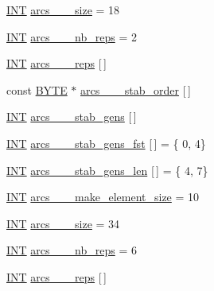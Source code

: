 \begin{DoxyCompactItemize}
\item 
\mbox{\hyperlink{galois_8h_a09fddde158a3a20bd2dcadb609de11dc}{I\+NT}} \mbox{\hyperlink{data__hyperovals_8_c_ae3995856eaa98577c99a31e5ce34eaf9}{arcs\+\_\+\_\+\_\+size}} = 18
\item 
\mbox{\hyperlink{galois_8h_a09fddde158a3a20bd2dcadb609de11dc}{I\+NT}} \mbox{\hyperlink{data__hyperovals_8_c_a71de31b2b031359e9dc748f8ffa0613e}{arcs\+\_\+\_\+\_\+nb\+\_\+reps}} = 2
\item 
\mbox{\hyperlink{galois_8h_a09fddde158a3a20bd2dcadb609de11dc}{I\+NT}} \mbox{\hyperlink{data__hyperovals_8_c_a582766518ac36ef31274b15f9a3f41bd}{arcs\+\_\+\_\+\_\+reps}} \mbox{[}$\,$\mbox{]}
\item 
const \mbox{\hyperlink{galois_8h_ab6cc7b4aeb6ea31aba2b3fbfc83ff5e6}{B\+Y\+TE}} $\ast$ \mbox{\hyperlink{data__hyperovals_8_c_a9ccc6fe66ced70ae50d20d56d840eaa4}{arcs\+\_\+\_\+\_\+stab\+\_\+order}} \mbox{[}$\,$\mbox{]}
\item 
\mbox{\hyperlink{galois_8h_a09fddde158a3a20bd2dcadb609de11dc}{I\+NT}} \mbox{\hyperlink{data__hyperovals_8_c_aa7153565dd8f8939c4ba08174e981ea4}{arcs\+\_\+\_\+\_\+stab\+\_\+gens}} \mbox{[}$\,$\mbox{]}
\item 
\mbox{\hyperlink{galois_8h_a09fddde158a3a20bd2dcadb609de11dc}{I\+NT}} \mbox{\hyperlink{data__hyperovals_8_c_a3324a863b82983f162ecf7af92f4b6a7}{arcs\+\_\+\_\+\_\+stab\+\_\+gens\+\_\+fst}} \mbox{[}$\,$\mbox{]} = \{ 0, 4\}
\item 
\mbox{\hyperlink{galois_8h_a09fddde158a3a20bd2dcadb609de11dc}{I\+NT}} \mbox{\hyperlink{data__hyperovals_8_c_a720478c24590f3892d36563e5574a30f}{arcs\+\_\+\_\+\_\+stab\+\_\+gens\+\_\+len}} \mbox{[}$\,$\mbox{]} = \{ 4, 7\}
\item 
\mbox{\hyperlink{galois_8h_a09fddde158a3a20bd2dcadb609de11dc}{I\+NT}} \mbox{\hyperlink{data__hyperovals_8_c_ac3422767c6027da27b351b259b0fd00f}{arcs\+\_\+\_\+\_\+make\+\_\+element\+\_\+size}} = 10
\item 
\mbox{\hyperlink{galois_8h_a09fddde158a3a20bd2dcadb609de11dc}{I\+NT}} \mbox{\hyperlink{data__hyperovals_8_c_aa12028300d866f9eb4c728c9a245812a}{arcs\+\_\+\_\+\_\+size}} = 34
\item 
\mbox{\hyperlink{galois_8h_a09fddde158a3a20bd2dcadb609de11dc}{I\+NT}} \mbox{\hyperlink{data__hyperovals_8_c_a5d89b4aa5f2b3b95e9ae8940ebf22732}{arcs\+\_\+\_\+\_\+nb\+\_\+reps}} = 6
\item 
\mbox{\hyperlink{galois_8h_a09fddde158a3a20bd2dcadb609de11dc}{I\+NT}} \mbox{\hyperlink{data__hyperovals_8_c_ae07cc15a2ce2ebf83e514a321d62af1c}{arcs\+\_\+\_\+\_\+reps}} \mbox{[}$\,$\mbox{]}

\end{DoxyCompactItemize}
